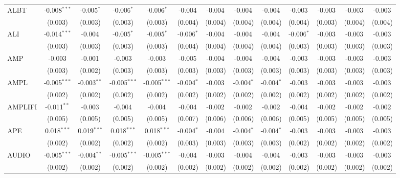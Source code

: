 \begin{table}[!htbp]
\begin{tabular}{@{\extracolsep{5pt}}lcccccccccccc}
 ALBT & -0.008$^{***}$ & -0.005$^{*}$ & -0.006$^{*}$ & -0.006$^{*}$ & -0.004$^{}$ & -0.004$^{}$ & -0.004$^{}$ & -0.004$^{}$ & -0.003$^{}$ & -0.003$^{}$ & -0.003$^{}$ & -0.003$^{}$ \\
  & (0.003) & (0.003) & (0.003) & (0.003) & (0.004) & (0.004) & (0.004) & (0.004) & (0.004) & (0.003) & (0.004) & (0.004) \\
 ALI & -0.014$^{***}$ & -0.004$^{}$ & -0.005$^{*}$ & -0.005$^{*}$ & -0.006$^{*}$ & -0.004$^{}$ & -0.004$^{}$ & -0.004$^{}$ & -0.006$^{*}$ & -0.003$^{}$ & -0.003$^{}$ & -0.003$^{}$ \\
  & (0.003) & (0.003) & (0.003) & (0.003) & (0.004) & (0.004) & (0.004) & (0.004) & (0.003) & (0.003) & (0.003) & (0.003) \\
 AMP & -0.003$^{}$ & -0.001$^{}$ & -0.003$^{}$ & -0.003$^{}$ & -0.005$^{}$ & -0.004$^{}$ & -0.004$^{}$ & -0.004$^{}$ & -0.003$^{}$ & -0.003$^{}$ & -0.003$^{}$ & -0.003$^{}$ \\
  & (0.003) & (0.002) & (0.003) & (0.003) & (0.003) & (0.003) & (0.003) & (0.003) & (0.003) & (0.003) & (0.003) & (0.003) \\
 AMPL & -0.005$^{***}$ & -0.003$^{**}$ & -0.005$^{***}$ & -0.005$^{***}$ & -0.004$^{*}$ & -0.003$^{}$ & -0.004$^{*}$ & -0.004$^{*}$ & -0.003$^{}$ & -0.003$^{}$ & -0.003$^{}$ & -0.003$^{}$ \\
  & (0.002) & (0.002) & (0.002) & (0.002) & (0.002) & (0.002) & (0.002) & (0.002) & (0.002) & (0.002) & (0.002) & (0.002) \\
 AMPLIFI & -0.011$^{**}$ & -0.003$^{}$ & -0.004$^{}$ & -0.004$^{}$ & -0.004$^{}$ & -0.002$^{}$ & -0.002$^{}$ & -0.002$^{}$ & -0.004$^{}$ & -0.002$^{}$ & -0.002$^{}$ & -0.002$^{}$ \\
  & (0.005) & (0.005) & (0.005) & (0.005) & (0.007) & (0.006) & (0.006) & (0.006) & (0.005) & (0.005) & (0.005) & (0.005) \\
 APE & 0.018$^{***}$ & 0.019$^{***}$ & 0.018$^{***}$ & 0.018$^{***}$ & -0.004$^{*}$ & -0.004$^{}$ & -0.004$^{*}$ & -0.004$^{*}$ & -0.003$^{}$ & -0.003$^{}$ & -0.003$^{}$ & -0.003$^{}$ \\
  & (0.002) & (0.002) & (0.002) & (0.002) & (0.003) & (0.003) & (0.003) & (0.003) & (0.002) & (0.002) & (0.002) & (0.002) \\
 AUDIO & -0.005$^{***}$ & -0.004$^{**}$ & -0.005$^{***}$ & -0.005$^{***}$ & -0.004$^{}$ & -0.003$^{}$ & -0.004$^{}$ & -0.004$^{}$ & -0.003$^{}$ & -0.003$^{}$ & -0.003$^{}$ & -0.003$^{}$ \\
  & (0.002) & (0.002) & (0.002) & (0.002) & (0.002) & (0.002) & (0.002) & (0.002) & (0.002) & (0.002) & (0.002) & (0.002) \\

\end{tabular}
\end{table}
